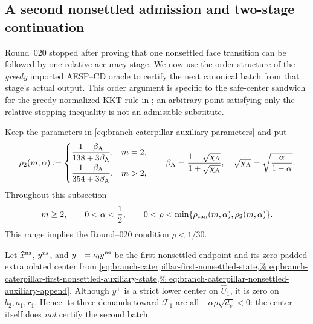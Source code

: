 \subsection{A second nonsettled admission and two-stage continuation}
\label{sec:branch-caterpillar-second-nonsettled-continuation}

Round~020 stopped after proving that one nonsettled face transition can be
followed by one relative-accuracy stage.  We now use the order structure of
the \emph{greedy} imported AESP--CD oracle to certify the next canonical
batch from that stage's actual output.  This order argument is specific to
the safe-center sandwich for the greedy normalized-KKT rule in
; an arbitrary point satisfying only the
relative stopping inequality is not an admissible substitute.

Keep the parameters in
\cref{eq:branch-caterpillar-auxiliary-parameters} and put
\begin{equation}
 \rho_2(m,\alpha):=
 \begin{cases}
 \dfrac{1+\beta_{\rm A}}{138+3\beta_{\rm A}},&m=2,\\[7pt]
 \dfrac{1+\beta_{\rm A}}{354+3\beta_{\rm A}},&m>2,
 \end{cases}
 \qquad
 \beta_{\rm A}=
 \frac{1-\sqrt{\chi_{\rm A}}}{1+\sqrt{\chi_{\rm A}}},
 \quad
 \sqrt{\chi_{\rm A}}=\sqrt{\frac{\alpha}{1-\alpha}}.
 \label{eq:branch-caterpillar-second-nonsettled-threshold}
\end{equation}
Throughout this subsection
\begin{equation}
 m\geq2,
 \qquad 0<\alpha<\frac12,
 \qquad
 0<\rho<\min\{\rho_{\rm can}(m,\alpha),\rho_2(m,\alpha)\}.
 \label{eq:branch-caterpillar-second-nonsettled-range}
\end{equation}
This range implies the Round--020 condition $\rho<1/30$.

Let $\widehat x^{\rm ns}$, $y^{\rm ns}$, and $y^+=\iota_0y^{\rm ns}$ be
the first nonsettled endpoint and its zero-padded extrapolated center from
\cref{eq:branch-caterpillar-first-nonsettled-state,%
eq:branch-caterpillar-first-nonsettled-auxiliary-state,%
eq:branch-caterpillar-nonsettled-auxiliary-append}.  Although $y^+$ is a
strict lower center on $\widehat U_1$, it is zero on
$b_2,a_1,r_1$.  Hence its three demands toward $\mathcal F_1$ are all
$-\alpha\rho\sqrt{d_v}<0$: the center itself does \emph{not} certify the
second batch.

